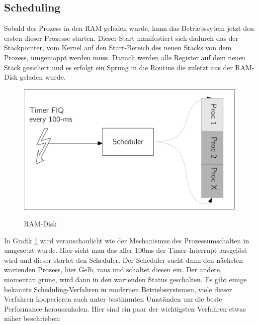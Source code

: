 \subsection{Scheduling}
Sobald der Prozess in den RAM geladen wurde, kann das Betriebssytem jetzt den ersten dieser Prozesse starten. Dieser Start manifestiert sich dadurch das der Stackpointer, vom Kernel auf den Start-Bereich des neuen Stacks von dem Prozess, umgemappt werden muss. Danach werden alle Register auf dem neuen Stack gesichert und es erfolgt ein Sprung in die Routine die zuletzt aus der RAM-Disk geladen wurde. 
\begin{figure}[H]
	\begin{center}	
	\caption{RAM-Disk}
	\includegraphics[scale=0.60]{common/scheduler.pdf}
	\label{scheduler}
	\end{center}
\end{figure}
\noindent
In Grafik \ref{scheduler} wird veranschaulicht wie der Mechanismus des Prozessumschalten in \mops umgesetzt wurde. Hier sieht man das aller 100ms der Timer-Interrupt ausgel\"ost wird und dieser startet den Scheduler. Der Scheduler sucht dann den n\"achsten wartenden Prozess, hier Gelb, raus und schaltet diesen ein. Der andere, momentan gr\"une, wird dann in den wartenden Status geschalten.
Es gibt einige bekannte Scheduling-Verfahren in modernen Betriebssystemen, viele dieser Verfahren kooperieren auch unter bestimmten Umst\"anden um die beste Performance herauszuholen. Hier sind ein paar der wichtigsten Verfahren etwas n\"aher beschrieben:
